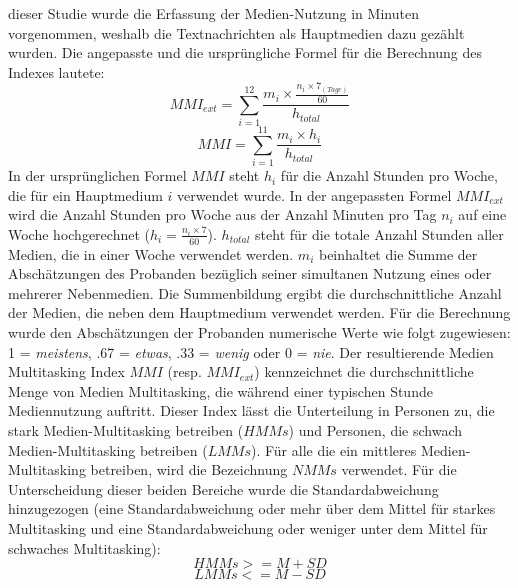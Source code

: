 dieser Studie wurde die Erfassung der Medien-Nutzung in Minuten vorgenommen, weshalb die Textnachrichten als Hauptmedien dazu gezählt wurden. Die angepasste und die ursprüngliche Formel für die Berechnung des Indexes lautete:
\begin{equation}\label{formel.mmiext}
    MMI_{ext}=\sum_{i=1}^{12} \frac{m_{i} \times \frac{n_{i} \times 7_{(Tage)}}{60}}{h_{total}}
\end{equation}
\begin{equation}\label{formel.mmi}
    MMI=\sum_{i=1}^{11} \frac{m_{i} \times h_{i}}{h_{total}}
\end{equation}
In der ursprünglichen Formel $MMI$ steht \(h_{i}\) für die Anzahl Stunden pro Woche, die für ein Hauptmedium \(i\) verwendet wurde. In der angepassten Formel $MMI_{ext}$ wird die Anzahl Stunden pro Woche aus der Anzahl Minuten pro Tag \(n_i\) auf eine Woche hochgerechnet (\(h_{i}=\frac{n_{i} \times 7}{60}\)). \(h_{total}\) steht für die totale Anzahl Stunden aller Medien, die in einer Woche verwendet werden. \(m_i\) beinhaltet die Summe der Abschätzungen des Probanden bezüglich seiner simultanen Nutzung eines oder mehrerer Nebenmedien. Die Summenbildung ergibt die durchschnittliche Anzahl der Medien, die neben dem Hauptmedium verwendet werden. Für die Berechnung wurde den Abschätzungen der Probanden numerische Werte wie folgt zugewiesen: 1 = \textit{meistens}, .67 = \textit{etwas}, .33 = \textit{wenig} oder 0 = \textit{nie}. Der resultierende Medien Multitasking Index $MMI$ (resp. $MMI_{ext}$) kennzeichnet die durchschnittliche Menge von Medien Multitasking, die während einer typischen Stunde Mediennutzung auftritt. Dieser Index lässt die Unterteilung in Personen zu, die stark Medien-Multitasking betreiben ($HMMs$) und Personen, die schwach Medien-Multitasking betreiben ($LMMs$). Für alle die ein mittleres Medien-Multitasking betreiben, wird die Bezeichnung $NMMs$ verwendet. Für die Unterscheidung dieser beiden Bereiche wurde die Standardabweichung hinzugezogen (eine Standardabweichung oder mehr über dem Mittel für starkes Multitasking und eine Standardabweichung oder weniger unter dem Mittel für schwaches Multitasking): 
\begin{equation}\label{formel.hmms}
    HMMs>=M+SD
\end{equation}
\begin{equation}\label{formel.lmms}
    LMMs<=M-SD
\end{equation}

